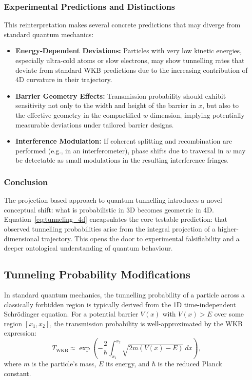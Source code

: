 \documentclass[12pt]{article}
\begin{document}
\subsubsection{Experimental Predictions and Distinctions}

This reinterpretation makes several concrete predictions that may diverge from standard quantum mechanics:

\begin{itemize}
    \item \textbf{Energy-Dependent Deviations:} Particles with very low kinetic energies, especially ultra-cold atoms or slow electrons, may show tunnelling rates that deviate from standard WKB predictions due to the increasing contribution of 4D curvature in their trajectory.

    \item \textbf{Barrier Geometry Effects:} Transmission probability should exhibit sensitivity not only to the width and height of the barrier in \( x \), but also to the effective geometry in the compactified \( w \)-dimension, implying potentially measurable deviations under tailored barrier designs.

    \item \textbf{Interference Modulation:} If coherent splitting and recombination are performed (e.g., in an interferometer), phase shifts due to traversal in \( w \) may be detectable as small modulations in the resulting interference fringes.
\end{itemize}

\subsubsection*{Conclusion}

The projection-based approach to quantum tunnelling introduces a novel conceptual shift: what is probabilistic in 3D becomes geometric in 4D. Equation~\eqref{eq:tunneling_4d} encapsulates the core testable prediction: that observed tunnelling probabilities arise from the integral projection of a higher-dimensional trajectory. This opens the door to experimental falsifiability and a deeper ontological understanding of quantum behaviour.


\subsection{Tunneling Probability Modifications}

In standard quantum mechanics, the tunnelling probability of a particle across a classically forbidden region is typically derived from the 1D time-independent Schrödinger equation. For a potential barrier \( V(x) \) with \( V(x) > E \) over some region \( [x_1, x_2] \), the transmission probability is well-approximated by the WKB expression:
\begin{equation}
T_{\text{WKB}} \approx \exp\left(-\frac{2}{\hbar} \int_{x_1}^{x_2} \sqrt{2m(V(x) - E)} \, dx \right),
\label{eq:wkb_approx}
\end{equation}
where \( m \) is the particle’s mass, \( E \) its energy, and \( \hbar \) is the reduced Planck constant.
\end{document}
